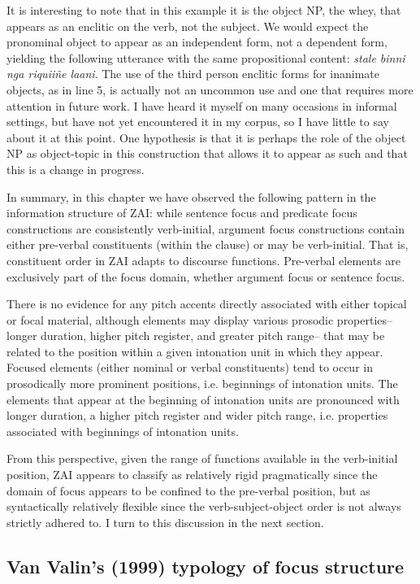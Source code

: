 It is interesting to note that in this example it is the object NP, the whey, that appears as an enclitic on the verb, not the subject. We would expect the pronominal object to appear as an independent form, not a dependent form, yielding the following utterance with the same propositional content: \textit{stale binni nga riquii\~{n}e laani}. The use of the third person enclitic forms for inanimate objects, as in line 5, is actually not an uncommon use and one that requires more attention in future work. I have heard it myself on many occasions in informal settings, but have not yet encountered it in my corpus, so I have little to say about it at this point. One hypothesis is that it is perhaps the role of the object NP as object-topic in this construction that allows it to appear as such and that this is a change in progress. 

In summary, in this chapter we have observed the following pattern in the information structure of ZAI: while sentence focus and predicate focus constructions are consistently verb-initial, argument focus constructions contain either pre-verbal constituents (within the clause) or may be verb-initial. That is, constituent order in ZAI adapts to discourse functions. Pre-verbal elements are exclusively part of the focus domain, whether argument focus or sentence focus.

There is no evidence for any pitch accents directly associated with either topical or focal material, although elements may display various prosodic properties-- longer duration, higher pitch register, and greater pitch range-- that may be related to the position within a given intonation unit in which they appear. Focused elements (either nominal or verbal constituents) tend to occur in prosodically more prominent positions, i.e. beginnings of intonation units. The elements that appear at the beginning of intonation units are pronounced with longer duration, a higher pitch register and wider pitch range, i.e. properties associated with beginnings of intonation units.

From this perspective, given the range of functions available in the verb-initial position, ZAI appears to classify as relatively rigid pragmatically since the domain of focus appears to be confined to the pre-verbal position, but as syntactically relatively flexible since the verb-subject-object order is not always strictly adhered to. I turn to this discussion in the next section.


\subsection{Van Valin's (1999) typology of focus structure}

